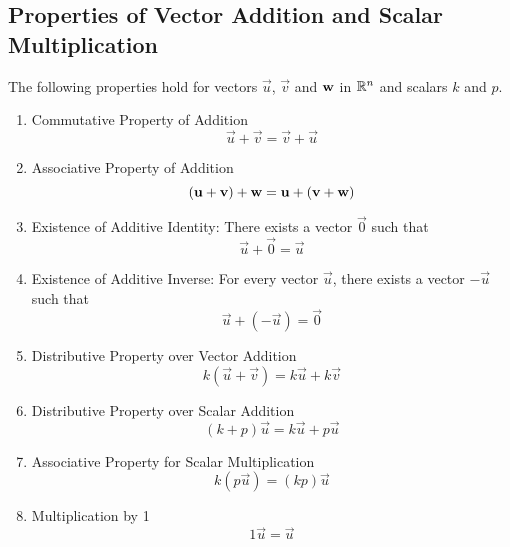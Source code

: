 \documentclass{ximera}
\begin{document}
\begin{image}[4.5in]
\end{image}
\subsection*{Properties of Vector Addition and Scalar Multiplication}
  \begin{theorem}\label{th:vecproperties} The following properties hold for vectors $\vec{u}$, $\vec{v}$ and ${\bf w}$ in $\RR^n$ and scalars $k$ and $p$.
  \begin{enumerate}
  \item \label{item:commvectoradd}
  Commutative Property of Addition
  $$\vec{u}+\vec{v}=\vec{v}+\vec{u}$$
  \item \label{item:assocvectoradd}
  Associative Property of Addition
  $$(\vec{u}+\vec{v})+{\bf w}=\vec{u}+(\vec{v}+{\bf w})$$
  \item \label{item:identityvectoradd}
  Existence of Additive Identity: There exists a vector $\vec{0}$ such that
  $$\vec{u}+\vec{0}=\vec{u}$$
  \item \label{item:inversevectoradd}
  Existence of Additive Inverse: For every vector $\vec{u}$, there exists a vector $-\vec{u}$ such that
  $$\vec{u}+(-\vec{u})=\vec{0}$$
  \item\label{item:distvectoradd}
  Distributive Property over Vector Addition
  $$k(\vec{u}+\vec{v})=k\vec{u}+k\vec{v}$$
  \item\label{item:distvectoradd2}
  Distributive Property over Scalar Addition
  $$(k+p)\vec{u}=k\vec{u}+p\vec{u}$$
  \item \label{item:assocvectorscalarmult}
  Associative Property for Scalar Multiplication
  $$k(p\vec{u})=(kp)\vec{u}$$
  \item \label{item:onevectorscalarmult}
  Multiplication by 1
  $$1\vec{u}=\vec{u}$$
  \end{enumerate}
\end{theorem}
\end{document}
